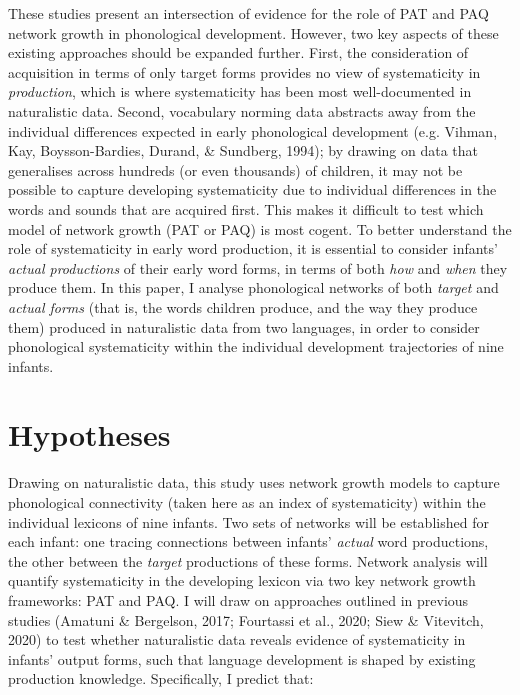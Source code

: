 \documentclass[
  man,mask,floatsintext]{apa6}
\begin{document}
These studies present an intersection of evidence for the role of PAT and PAQ network growth in phonological development. However, two key aspects of these existing approaches should be expanded further. First, the consideration of acquisition in terms of only target forms provides no view of systematicity in \emph{production}, which is where systematicity has been most well-documented in naturalistic data. Second, vocabulary norming data abstracts away from the individual differences expected in early phonological development (e.g. Vihman, Kay, Boysson-Bardies, Durand, \& Sundberg, 1994); by drawing on data that generalises across hundreds (or even thousands) of children, it may not be possible to capture developing systematicity due to individual differences in the words and sounds that are acquired first. This makes it difficult to test which model of network growth (PAT or PAQ) is most cogent. To better understand the role of systematicity in early word production, it is essential to consider infants' \emph{actual productions} of their early word forms, in terms of both \emph{how} and \emph{when} they produce them. In this paper, I analyse phonological networks of both \emph{target} and \emph{actual forms} (that is, the words children produce, and the way they produce them) produced in naturalistic data from two languages, in order to consider phonological systematicity within the individual development trajectories of nine infants.

\hypertarget{hypotheses}{%
\section{Hypotheses}\label{hypotheses}}

Drawing on naturalistic data, this study uses network growth models to capture phonological connectivity (taken here as an index of systematicity) within the individual lexicons of nine infants. Two sets of networks will be established for each infant: one tracing connections between infants' \emph{actual} word productions, the other between the \emph{target} productions of these forms. Network analysis will quantify systematicity in the developing lexicon via two key network growth frameworks: PAT and PAQ. I will draw on approaches outlined in previous studies (Amatuni \& Bergelson, 2017; Fourtassi et al., 2020; Siew \& Vitevitch, 2020) to test whether naturalistic data reveals evidence of systematicity in infants' output forms, such that language development is shaped by existing production knowledge. Specifically, I predict that:
\end{document}
